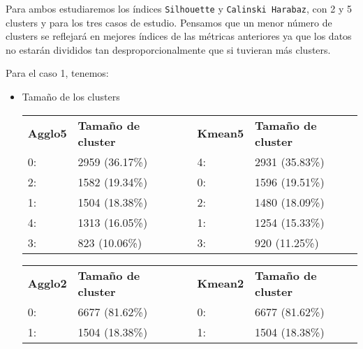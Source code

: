 	
	
	
	
	
	
	
	Para ambos estudiaremos los índices \texttt{Silhouette} y \texttt{Calinski Harabaz}, con 2 y 5 clusters y para los tres casos de estudio.
	Pensamos que un menor número de clusters se reflejará en mejores índices de las métricas anteriores ya que los datos no estarán divididos tan desproporcionalmente que si tuvieran más clusters.
	
	Para el caso 1, tenemos:
	\begin{itemize}
		\item Tamaño de los clusters
		
		\begin{table}[H]
		\centering
				\begin{tabular}{|l|l|l|l|l|}
					\cline{1-2} \cline{4-5}
					\textbf{Agglo5} & \textbf{Tamaño de cluster} & \multirow{6}{*}{} & \textbf{Kmean5} & \textbf{Tamaño de cluster} \\ \cline{1-2} \cline{4-5} 
					0:              & 2959 (36.17\%)             &                   & 4:              & 2931 (35.83\%)             \\ \cline{1-2} \cline{4-5} 
					2:              & 1582 (19.34\%)             &                   & 0:              & 1596 (19.51\%)             \\ \cline{1-2} \cline{4-5} 
					1:              & 1504 (18.38\%)             &                   & 2:              & 1480 (18.09\%)             \\ \cline{1-2} \cline{4-5} 
					4:              & 1313 (16.05\%)             &                   & 1:              & 1254 (15.33\%)             \\ \cline{1-2} \cline{4-5} 
					3:              & 823 (10.06\%)              &                   & 3:              & 920 (11.25\%)              \\ \cline{1-2} \cline{4-5} 
				\end{tabular}%
			
		\end{table}
	
	
		\begin{table}[H]
		\centering
				\begin{tabular}{|l|l|l|l|l|}
					\cline{1-2} \cline{4-5}
					\textbf{Agglo2} & \textbf{Tamaño de cluster} &  & \textbf{Kmean2} & \textbf{Tamaño de cluster} \\ \cline{1-2} \cline{4-5} 
					0:              & 6677 (81.62\%)             &  & 0:              & 6677 (81.62\%)             \\ \cline{1-2} \cline{4-5} 
					1:              & 1504 (18.38\%)             &  & 1:              & 1504 (18.38\%)             \\ \cline{1-2} \cline{4-5} 
				\end{tabular}%
			

\end{table}
\end{itemize}
